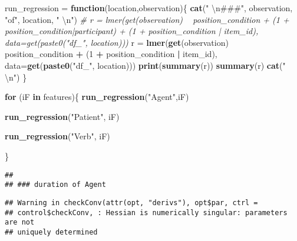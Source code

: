 \documentclass[]{article}
\newenvironment{Shaded}{\begin{snugshade}}{\end{snugshade}}
\newcommand{\CharTok}[1]{\textcolor[rgb]{0.31,0.60,0.02}{#1}}
\newcommand{\CommentTok}[1]{\textcolor[rgb]{0.56,0.35,0.01}{\textit{#1}}}
\newcommand{\ControlFlowTok}[1]{\textcolor[rgb]{0.13,0.29,0.53}{\textbf{#1}}}
\newcommand{\DataTypeTok}[1]{\textcolor[rgb]{0.13,0.29,0.53}{#1}}
\newcommand{\DecValTok}[1]{\textcolor[rgb]{0.00,0.00,0.81}{#1}}
\newcommand{\KeywordTok}[1]{\textcolor[rgb]{0.13,0.29,0.53}{\textbf{#1}}}
\newcommand{\NormalTok}[1]{#1}
\newcommand{\OperatorTok}[1]{\textcolor[rgb]{0.81,0.36,0.00}{\textbf{#1}}}
\newcommand{\StringTok}[1]{\textcolor[rgb]{0.31,0.60,0.02}{#1}}
\begin{document}
\begin{Shaded}
\begin{Highlighting}[]
\NormalTok{run_regression =}\StringTok{ }\ControlFlowTok{function}\NormalTok{(location,observation)\{}
\KeywordTok{cat}\NormalTok{(}\StringTok{"  }\CharTok{\textbackslash{}n}\StringTok{###"}\NormalTok{, observation, }\StringTok{"of"}\NormalTok{, location, }\StringTok{"  }\CharTok{\textbackslash{}n}\StringTok{"}\NormalTok{)}
    \CommentTok{# r = lmer(get(observation) ~ position_condition + (1 + position_condition|participant) + (1 + position_condition | item_id), data=get(paste0("df_", location)))}
\NormalTok{        r =}\StringTok{ }\KeywordTok{lmer}\NormalTok{(}\KeywordTok{get}\NormalTok{(observation) }\OperatorTok{~}\StringTok{ }\NormalTok{position_condition  }\OperatorTok{+}\StringTok{ }\NormalTok{(}\DecValTok{1} \OperatorTok{+}\StringTok{ }\NormalTok{position_condition }\OperatorTok{|}\StringTok{ }\NormalTok{item_id), }\DataTypeTok{data=}\KeywordTok{get}\NormalTok{(}\KeywordTok{paste0}\NormalTok{(}\StringTok{"df_"}\NormalTok{, location)))}
  \KeywordTok{print}\NormalTok{(}\KeywordTok{summary}\NormalTok{(r))}
  \KeywordTok{summary}\NormalTok{(r)}
  \KeywordTok{cat}\NormalTok{(}\StringTok{"  }\CharTok{\textbackslash{}n}\StringTok{"}\NormalTok{)}
\NormalTok{\}}



\ControlFlowTok{for}\NormalTok{ (iF }\ControlFlowTok{in}\NormalTok{ features)\{}
  \KeywordTok{run_regression}\NormalTok{(}\StringTok{"Agent"}\NormalTok{,iF)}

  
  \KeywordTok{run_regression}\NormalTok{(}\StringTok{"Patient"}\NormalTok{, iF)}

  \KeywordTok{run_regression}\NormalTok{(}\StringTok{"Verb"}\NormalTok{, iF)}

  
  
\NormalTok{\}}
\end{Highlighting}
\end{Shaded}

\begin{verbatim}
##   
## ### duration of Agent
\end{verbatim}

\begin{verbatim}
## Warning in checkConv(attr(opt, "derivs"), opt$par, ctrl =
## control$checkConv, : Hessian is numerically singular: parameters are not
## uniquely determined
\end{verbatim}
\end{document}
